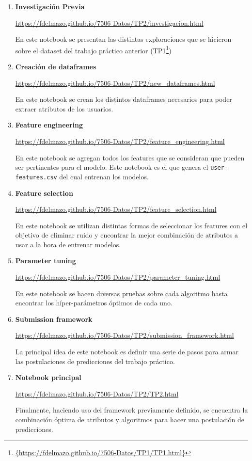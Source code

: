 \documentclass[a4paper]{article}
\begin{document}
\begin{enumerate} 
	\item \textbf{Investigación Previa}

	\small{\url{https://fdelmazo.github.io/7506-Datos/TP2/investigacion.html}}

	En este notebook se presentan las distintas exploraciones que se hicieron sobre el dataset del trabajo práctico anterior (TP1\footnote{\url{{https://fdelmazo.github.io/7506-Datos/TP1/TP1.html}}})

	\item \textbf{Creación de dataframes}

	\small{\url{https://fdelmazo.github.io/7506-Datos/TP2/new_dataframes.html}}

	En este notebook se crean los distintos dataframes necesarios para poder extraer atributos de los usuarios.

	\item \textbf{Feature engineering}

	\small{\url{https://fdelmazo.github.io/7506-Datos/TP2/feature_engineering.html}}

	En este notebook se agregan todos los features que se consideran que pueden ser pertinentes para el modelo. Este notebook es el que genera el \texttt{user-features.csv} del cual entrenan los modelos.

	\item \textbf{Feature selection}

	\small{\url{https://fdelmazo.github.io/7506-Datos/TP2/feature_selection.html}}

	En este notebook se utilizan distintas formas de seleccionar los features con el objetivo de eliminar ruido y encontrar la mejor combinación de atributos a usar a la hora de entrenar modelos.

	\item \textbf{Parameter tuning}

	\small{\url{https://fdelmazo.github.io/7506-Datos/TP2/parameter_tuning.html}}

	En este notebook se hacen diversas pruebas sobre cada algoritmo hasta encontrar los híper-parámetros óptimos de cada uno.

	\item \textbf{Submission framework}

	\small{\url{https://fdelmazo.github.io/7506-Datos/TP2/submission_framework.html}}

	La principal idea de este notebook es definir una serie de pasos para armar las postulaciones de predicciones del trabajo práctico.

	\item \textbf{Notebook principal}

	\small{\url{https://fdelmazo.github.io/7506-Datos/TP2/TP2.html}}

	Finalmente, haciendo uso del framework previamente definido, se encuentra la combinación óptima de atributos y algoritmos para hacer una postulación de predicciones.

\end{enumerate}
\end{document}
